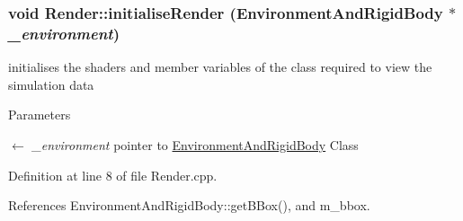 \hypertarget{class_render_a52ff4b4560ad5ef64c8babfc2132e7c0}{
\subsubsection[{initialiseRender}]{\setlength{\rightskip}{0pt plus 5cm}void Render::initialiseRender ({\bf EnvironmentAndRigidBody} $\ast$ {\em \_\-environment})}}
\label{class_render_a52ff4b4560ad5ef64c8babfc2132e7c0}


initialises the shaders and member variables of the class required to view the simulation data 


\begin{DoxyParams}{Parameters}
\item[\mbox{$\leftarrow$} {\em \_\-environment}]pointer to \hyperlink{class_environment_and_rigid_body}{EnvironmentAndRigidBody} Class \end{DoxyParams}


Definition at line 8 of file Render.cpp.



References EnvironmentAndRigidBody::getBBox(), and m\_\-bbox.




